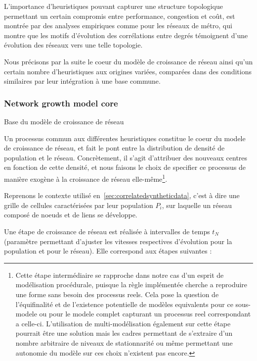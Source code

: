 L'importance d'heuristiques pouvant capturer une structure topologique permettant un certain compromis entre performance, congestion et coût, est montrée par des analyses empiriques comme \cite{2012arXiv1202.1747W} pour les réseaux de métro, qui montre que les motifs d'évolution des corrélations entre degrés témoignent d'une évolution des réseaux vers une telle topologie.


Nous précisons par la suite le coeur du modèle de croissance de réseau ainsi qu'un certain nombre d'heuristiques aux origines variées, comparées dans des conditions similaires par leur intégration à une base commune.


\subsubsection{Network growth model core}{Base du modèle de croissance de réseau}


Un processus commun aux différentes heuristiques constitue le coeur du modele de croissance de réseau, et fait le pont entre la distribution de densité de population et le réseau. Concrètement, il s'agit d'attribuer des nouveaux centres en fonction de cette densité, et nous faisons le choix de specifier ce processus de manière exogène à la croissance de réseau elle-même\footnote{Cette étape intermédiaire se rapproche dans notre cas d'un esprit de modélisation procédurale, puisque la règle implémentée cherche a reproduire une forme sans besoin des processus reels. Cela pose la question de l'équifinalité et de l'existence potentielle de modèles equivalents pour ce sous-modele ou pour le modele complet capturant un processus reel correspondant a celle-ci. L'utilisation de multi-modélisation également sur cette étape pourrait être une solution mais les cadres permettant de s'extraire d'un nombre arbitraire de niveaux de stationnarité ou même permettant une autonomie du modèle sur ces choix n'existent pas encore.}.


Reprenons le contexte utilisé en~\ref{sec:correlatedsyntheticdata}, c'est à dire une grille de cellules caractérisées par leur population $P_i$, sur laquelle un réseau composé de noeuds et de liens se développe.

Une étape de croissance de réseau est réalisée à intervalles de temps $t_N$ (paramètre permettant d'ajuster les vitesses respectives d'évolution pour la population et pour le réseau). Elle correspond aux étapes suivantes :

